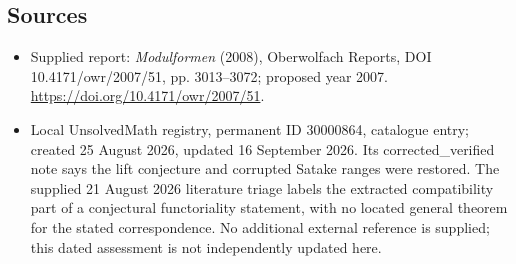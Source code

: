 \documentclass[11pt]{article}
\begin{document}
\subsection{Sources}
\begin{itemize}
\item Supplied report: \emph{Modulformen} (2008), Oberwolfach Reports, DOI 10.4171/owr/2007/51, pp. 3013--3072; proposed year 2007. \url{https://doi.org/10.4171/owr/2007/51}.
\item Local UnsolvedMath registry, permanent ID 30000864, catalogue entry; created 25 August 2026, updated 16 September 2026. Its corrected\_verified note says the lift conjecture and corrupted Satake ranges were restored. The supplied 21 August 2026 literature triage labels the extracted compatibility part of a conjectural functoriality statement, with no located general theorem for the stated correspondence. No additional external reference is supplied; this dated assessment is not independently updated here.
\end{itemize}
\end{document}
